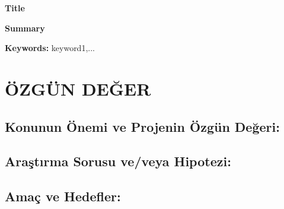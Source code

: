 \documentclass[a4paper]{article}
\begin{document}
\begin{summary}{\textbf{Title}}
\begin{center}
\textbf{Summary}
\end{center}

\lipsum[1-4]
\tcbline*
\noindent\textbf{Keywords:} 
keyword1,... 
\end{summary}


\section{ÖZGÜN DEĞER}

\subsection{Konunun Önemi ve Projenin Özgün Değeri:}

\begin{framed}
\lipsum[1-5]
\end{framed}


\subsection{Araştırma Sorusu ve/veya Hipotezi:}

\begin{framed}
\lipsum[1-5]
\end{framed}

\subsection{Amaç ve Hedefler:}

\begin{framed}
\lipsum[1-5]
\end{framed}
\end{document}
